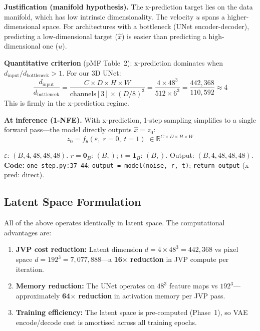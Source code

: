\documentclass[11pt,a4paper]{article}
\newcommand{\code}[1]{\texttt{#1}}
\begin{document}
\textbf{Justification (manifold hypothesis).}  The x-prediction target lies on
the data manifold, which has low intrinsic dimensionality.  The velocity $u$
spans a higher-dimensional space.  For architectures with a bottleneck (UNet
encoder-decoder), predicting a low-dimensional target ($\hat{x}$) is easier
than predicting a high-dimensional one ($u$).

\textbf{Quantitative criterion} (pMF Table~2): x-prediction dominates when
$d_{\mathrm{input}}/d_{\mathrm{bottleneck}} > 1$.  For our 3D UNet:
\begin{equation}
  \frac{d_{\mathrm{input}}}{d_{\mathrm{bottleneck}}}
    = \frac{C \times D \times H \times W}{\text{channels}[3] \times (D/8)^3}
    = \frac{4 \times 48^3}{512 \times 6^3}
    = \frac{442{,}368}{110{,}592} \approx 4
\end{equation}
This is firmly in the x-prediction regime.

\textbf{At inference (1-NFE).}  With x-prediction, 1-step sampling simplifies
to a single forward pass---the model directly outputs $\hat{x} = z_0$:
\begin{equation}
  z_0 = f_\theta(\varepsilon,\;r{=}0,\;t{=}1)
    \;\in \mathbb{R}^{C \times D \times H \times W}
  \label{eq:1nfe_xpred}
\end{equation}
\begin{shapes}
$\varepsilon$: $(B, 4, 48, 48, 48)$.
\quad $r = \mathbf{0}_B$: $(B,)$; $t = \mathbf{1}_B$: $(B,)$.
\quad Output: $(B, 4, 48, 48, 48)$.\\
\textbf{Code:} \code{one\_step.py:37--44}:
\code{output = model(noise, r, t)}; \code{return output} (x-pred: direct).
\end{shapes}

\subsection{Latent Space Formulation}

All of the above operates identically in latent space.  The computational
advantages are:
\begin{enumerate}[nosep]
  \item \textbf{JVP cost reduction:} Latent dimension
    $d = 4\times 48^3 = 442{,}368$ vs pixel space
    $d = 192^3 = 7{,}077{,}888$---a \textbf{16$\times$ reduction} in JVP
    compute per iteration.
  \item \textbf{Memory reduction:} The UNet operates on $48^3$ feature maps
    vs $192^3$---approximately \textbf{64$\times$ reduction} in activation
    memory per JVP pass.
  \item \textbf{Training efficiency:} The latent space is pre-computed
    (Phase~1), so VAE encode/decode cost is amortised across all training
    epochs.
\end{enumerate}
\end{document}
